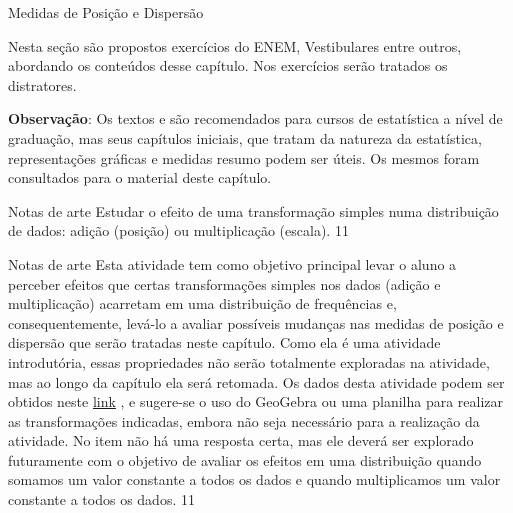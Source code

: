 \begin{apresentacao}{Medidas de Posição e Dispersão}

Nesta seção são propostos exercícios do ENEM, Vestibulares entre outros, abordando os conteúdos desse capítulo. Nos exercícios serão tratados os distratores.

\textbf{Observação}: Os textos \cite{bussab2017,levine2000,rossman1998} e \cite{triola2005} são recomendados para cursos de estatística a nível de graduação, mas seus capítulos iniciais, que tratam da natureza da estatística, representações gráficas e medidas resumo podem ser úteis. Os mesmos foram consultados para o material deste capítulo.

\end{apresentacao}

\def\currentcolor{session1}
\clearmargin
\clearmargin
\begin{objectives}{Notas de arte}
{
Estudar o efeito de uma transformação simples numa distribuição de dados: adição (posição) ou multiplicação (escala).
}{1}{1}
\end{objectives}
\begin{sugestions}{Notas de arte}
{
Esta atividade tem como objetivo principal levar o aluno a perceber efeitos que certas transformações simples nos dados (adição e multiplicação) acarretam em uma distribuição de frequências e, consequentemente, levá-lo a avaliar possíveis mudanças nas medidas de posição e dispersão que serão tratadas neste capítulo. Como ela é uma atividade introdutória, essas propriedades não serão totalmente exploradas na atividade, mas ao longo da capítulo ela será retomada. Os dados desta atividade podem ser obtidos neste \href{https://www.geogebra.org/m/TNh7dPCf}{link} , e sugere-se o uso do GeoGebra ou uma planilha para realizar as transformações indicadas, embora não seja necessário para a realização da atividade. No item  não há uma resposta certa, mas ele deverá ser explorado futuramente com o objetivo de avaliar os efeitos em uma distribuição quando somamos um valor constante a todos os dados e quando multiplicamos um valor constante a todos os dados.
}{1}{1}
\end{sugestions}
\clearmargin
